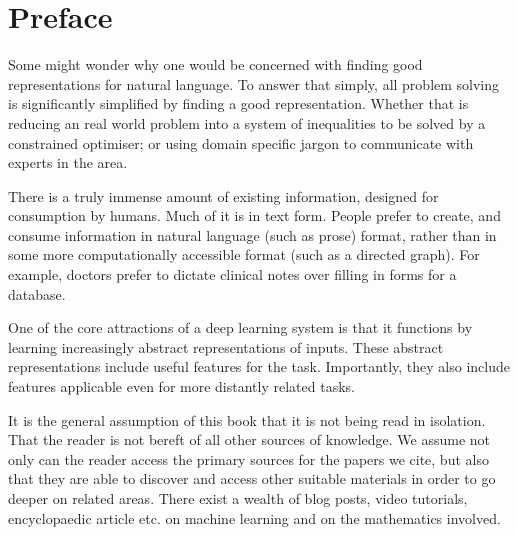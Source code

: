 \documentclass[12pt,parskip]{komatufte}
\begin{document}

\chapter{Preface}\label{sec:introduction}

Some might wonder why one would be concerned with finding good representations for natural language.
To answer that simply, all problem solving is significantly simplified by finding a good representation.
Whether that is reducing an real world problem into a system of inequalities to be solved by a constrained optimiser; or using domain specific jargon to communicate with experts in the area.



There is a truly immense amount of existing information, designed for consumption by humans.
Much of it is in text form.
People prefer to create, and consume information in natural language (such as prose) format,
rather than in some more computationally accessible format (such as a directed graph).
For example, doctors prefer to dictate clinical notes over filling in forms for a database.



One of the core attractions of a deep learning system is that it functions by learning increasingly abstract representations of inputs.
These abstract representations include useful features for the task.
Importantly, they also include features applicable even for more distantly related tasks.



It is the general assumption of this book that it is not being read in isolation.
That the reader is not bereft of all other sources of knowledge.
We assume not only can the reader access the primary sources for the papers we cite,
but also that they are able to discover and access other suitable materials 
in order to go deeper on related areas.
There exist a wealth of blog posts, video tutorials, encyclopaedic article etc. on machine learning and on the mathematics involved.
\end{document}
